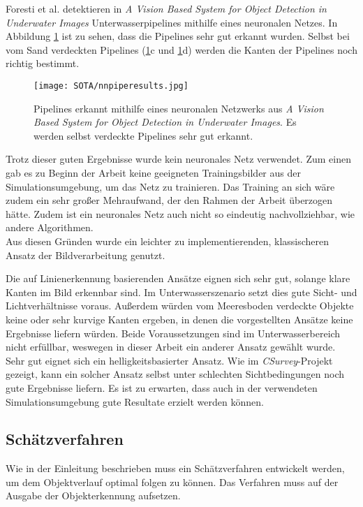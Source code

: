 Foresti et al. detektieren in \textit{A Vision Based System for Object Detection in
Underwater Images}\cite{foresti2000vision} Unterwasserpipelines mithilfe eines neuronalen Netzes. In Abbildung \ref{nnDet} ist zu sehen, dass die Pipelines sehr gut erkannt wurden. Selbst bei vom Sand verdeckten Pipelines (\ref{nnDet}c und \ref{nnDet}d) werden die Kanten der Pipelines noch richtig bestimmt.

\begin{figure}[H]
\centering
\texttt{[image: SOTA/nnpiperesults.jpg]}
\caption[Pipelinedetektion mit neuronalem Netzwerk.]{Pipelines erkannt mithilfe eines neuronalen Netzwerks aus \textit{A Vision Based System for Object Detection in Underwater Images}\cite{foresti2000vision}. Es werden selbst verdeckte Pipelines sehr gut erkannt.}
\label{nnDet}
\end{figure}
Trotz dieser guten Ergebnisse wurde kein neuronales Netz verwendet. Zum einen gab es zu Beginn der Arbeit keine geeigneten Trainingsbilder aus der Simulationsumgebung, um das Netz zu trainieren. Das Training an sich wäre zudem ein sehr großer Mehraufwand, der den Rahmen der Arbeit überzogen hätte. Zudem ist ein neuronales Netz auch nicht so eindeutig nachvollziehbar, wie andere Algorithmen.\\
Aus diesen Gründen wurde ein leichter zu implementierenden, klassischeren Ansatz der Bildverarbeitung genutzt.

Die auf Linienerkennung basierenden Ansätze eignen sich sehr gut, solange klare Kanten im Bild erkennbar sind. Im Unterwasserszenario setzt dies gute Sicht- und Lichtverhältnisse voraus. Außerdem würden vom Meeresboden verdeckte Objekte keine oder sehr kurvige Kanten ergeben, in denen die vorgestellten Ansätze keine Ergebnisse liefern würden. Beide Voraussetzungen sind im Unterwasserbereich nicht erfüllbar, weswegen in dieser Arbeit ein anderer Ansatz gewählt wurde.\\
Sehr gut eignet sich ein helligkeitsbasierter Ansatz. Wie im \textit{CSurvey}-Projekt\cite{Albiez2015CSurveyA} gezeigt, kann ein solcher Ansatz selbst unter schlechten Sichtbedingungen noch gute Ergebnisse liefern. Es ist zu erwarten, dass auch in der verwendeten Simulationsumgebung gute Resultate erzielt werden können.\\
\subsection{Schätzverfahren}
Wie in der Einleitung beschrieben muss ein Schätzverfahren entwickelt werden, um dem Objektverlauf optimal folgen zu können. Das Verfahren muss auf der Ausgabe der Objekterkennung aufsetzen.
